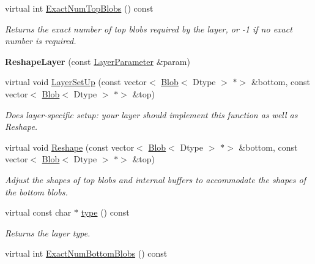 \begin{DoxyCompactItemize}
virtual int \mbox{\hyperlink{classcaffe_1_1_reshape_layer_a3318c2404c6072ba07178b48d39ef0f5}{Exact\+Num\+Top\+Blobs}} () const
\begin{DoxyCompactList}\small\item\em Returns the exact number of top blobs required by the layer, or -\/1 if no exact number is required. \end{DoxyCompactList}\item 
\mbox{\label{classcaffe_1_1_reshape_layer_a395797dafb00e39da4f9c60f0554eece}} 
{\bfseries Reshape\+Layer} (const \mbox{\hyperlink{classcaffe_1_1_layer_parameter}{Layer\+Parameter}} \&param)
\item 
virtual void \mbox{\hyperlink{classcaffe_1_1_reshape_layer_a5d832d4057a304791ecadd242f2c5a6e}{Layer\+Set\+Up}} (const vector$<$ \mbox{\hyperlink{classcaffe_1_1_blob}{Blob}}$<$ Dtype $>$ $\ast$$>$ \&bottom, const vector$<$ \mbox{\hyperlink{classcaffe_1_1_blob}{Blob}}$<$ Dtype $>$ $\ast$$>$ \&top)
\begin{DoxyCompactList}\small\item\em Does layer-\/specific setup\+: your layer should implement this function as well as Reshape. \end{DoxyCompactList}\item 
virtual void \mbox{\hyperlink{classcaffe_1_1_reshape_layer_ab071d750b8cef391e9fe0c67efaa4994}{Reshape}} (const vector$<$ \mbox{\hyperlink{classcaffe_1_1_blob}{Blob}}$<$ Dtype $>$ $\ast$$>$ \&bottom, const vector$<$ \mbox{\hyperlink{classcaffe_1_1_blob}{Blob}}$<$ Dtype $>$ $\ast$$>$ \&top)
\begin{DoxyCompactList}\small\item\em Adjust the shapes of top blobs and internal buffers to accommodate the shapes of the bottom blobs. \end{DoxyCompactList}\item 
\mbox{\label{classcaffe_1_1_reshape_layer_a127379b9839d0f8f464d78cae28a6118}} 
virtual const char $\ast$ \mbox{\hyperlink{classcaffe_1_1_reshape_layer_a127379b9839d0f8f464d78cae28a6118}{type}} () const
\begin{DoxyCompactList}\small\item\em Returns the layer type. \end{DoxyCompactList}\item 
virtual int \mbox{\hyperlink{classcaffe_1_1_reshape_layer_ad97ea6043b01351e85b39b512ae0e489}{Exact\+Num\+Bottom\+Blobs}} () const

\end{DoxyCompactItemize}
